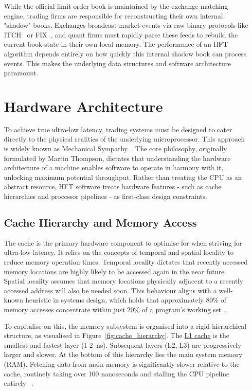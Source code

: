 
\vspace{1em}

While the official limit order book is maintained by the exchange matching engine, 
trading firms are responsible for reconstructing their own internal "shadow" books. 
Exchanges broadcast market events via raw binary protocols like 
ITCH~\citep{nasdaq_itch} or FIX~\citep{fix42_spec}, and 
quant firms must rapidly parse these feeds to rebuild the current book state in 
their own local memory. 
The performance of an HFT algorithm depends entirely on how quickly this internal 
shadow book can process events. 
This makes the underlying data structures and software architecture 
paramount.

\section{Hardware Architecture}

To achieve true ultra-low latency, trading systems must be designed to cater 
directly to the physical realities of the underlying microprocessor. This approach is widely 
known as Mechanical Sympathy~\citep{thompson2011disruptor}. The core philosophy, 
originally formulated by Martin Thompson, dictates that understanding 
the hardware architecture of a machine enables software to operate in 
harmony with it, unlocking maximum potential throughput. Rather than 
treating the CPU as an abstract resource, HFT software treats hardware 
features - such as cache hierarchies and processor pipelines - as 
first-class design constraints.
\subsection{Cache Hierarchy and Memory Access}

The cache is the primary hardware component to optimise for when 
striving for ultra-low latency. 
It relies on the concepts of temporal and spatial locality to reduce memory operation times. 
Temporal locality dictates that recently accessed memory locations are highly 
likely to be accessed again in the near future. 
Spatial locality assumes that memory locations physically adjacent to a recently 
accessed address will also be needed soon. This behaviour aligns with a 
well-known heuristic in systems design, which holds that approximately 
80\% of memory accesses concentrate within just 20\% of a program's 
working set~\citep{patterson2013cod}. 

To capitalise on this, the memory subsystem is organised into a rigid hierarchical 
structure, as visualised in Figure~\ref{fig:cache_hierarchy}. 
The \hyperref[app:glossary]{L1 cache} is the smallest and fastest layer (1-2~ns).
 Subsequent layers (L2, L3) are progressively larger and slower. 
At the bottom of this hierarchy lies the main system memory (RAM). 
Fetching data from main memory is significantly slower relative to the cache, 
routinely taking over 100 nanoseconds and stalling the CPU pipeline entirely
~\citep{patterson2013cod}.

